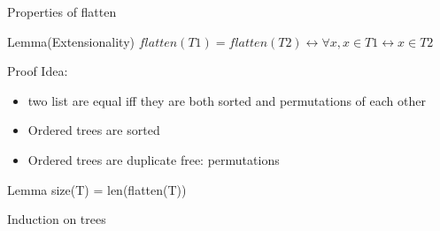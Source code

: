\documentclass{beamer}
\begin{document}
    \begin{frame}{Properties of flatten}
        \begin{block}{Lemma(Extensionality)}
            $flatten (T1) = flatten (T2) \leftrightarrow \forall x, x \in T1 \leftrightarrow x \in T2$
        \end{block}
        \begin{block}{Proof}
            Idea:
                \begin{itemize}
                    \item two list are equal iff they are both sorted and permutations of each other
                    \item Ordered trees are sorted
                    \item Ordered trees are duplicate free: permutations
                \end{itemize}
        \end{block}
        \begin{block}{Lemma}
            size(T) = len(flatten(T))
        \end{block}
    \end{frame}

    \begin{frame}[fragile]{Induction on trees}
    \end{frame}
    
\end{document}
